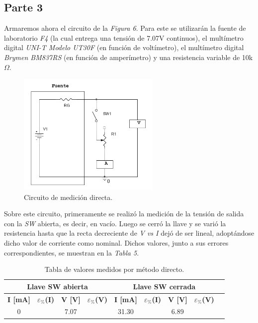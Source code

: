 \documentclass{article}
\begin{document}
\subsection{Parte 3}


	Armaremos ahora el circuito de la \textit{Figura 6}. Para este se utilizarán la fuente de laboratorio \textit{F4} (la cual entrega una tensión de 7.07V continuos), el multímetro digital \textit{UNI-T Modelo UT30F} (en función de voltímetro), el multímetro digital \textit{Brymen BM837RS} (en función de amperímetro) y una resistencia variable de 10k$\Omega$.
\bigskip


\begin{figure}[h]
	\centering
	\includegraphics[width=0.61\textwidth]{images/p3-item-a.jpg}
	\caption{Circuito de medición directa.}
\end{figure}
\bigskip\bigskip


\noindent Sobre este circuito, primeramente se realizó la medición de la tensión de salida con la \textit{SW} abierta, es decir, en vacío. Luego se cerró la llave y se varió la resistencia hasta que la recta decreciente de \textit{V vs I} dejó de ser lineal, adoptándose dicho valor de corriente como nominal. Dichos valores, junto a sus errores correspondientes, se muestran en la \textit{Tabla 5}.
\bigskip\bigskip


\begin{table}[!hbt]
	\begin{center}

		\begin{tabular}{|c|c|c|c|c|c|c|c|c|} \hline
			\multicolumn{4}{|c|}{\textbf{Llave SW abierta}} & \multicolumn{4}{c|}{\textbf{Llave SW cerrada}} \\ \hline
			\textbf{I [mA]} & \textbf{$\varepsilon_{\%}$(I)} & \textbf{V [V]} & \textbf{$\varepsilon_{\%}$(V)} & \textbf{I [mA]} & \textbf{$\varepsilon_{\%}$(I)} & \textbf{V [V]} & \textbf{$\varepsilon_{\%}$(V)} \\\cline{1-8}
			0 &  & 7.07 &  & 31.30 &  & 6.89 &  \\\cline{1-8}
		\end{tabular}

	\caption{Tabla de valores medidos por método directo.}
	\end{center}
\end{table}
\bigskip
\end{document}
